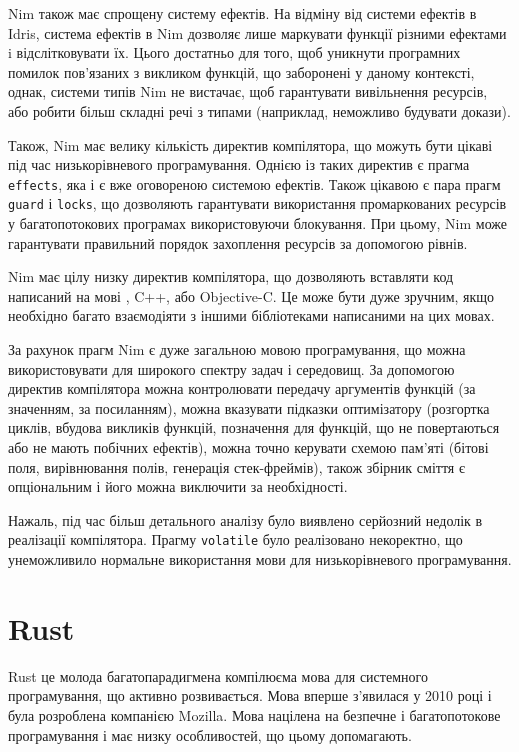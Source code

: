 \documentclass[oneside,14pt,a4paper,final]{myextreport}
\newcommand\code[1]{{\tt #1}}
\begin{document}
Nim також має спрощену систему ефектів. На відміну від системи ефектів в Idris, система ефектів в Nim дозволяє лише маркувати функції різними ефектами i відслітковувати їх. Цього достатньо для того, щоб уникнути програмних помилок пов'язаних з викликом функцій, що заборонені у даному контексті, однак, системи типів Nim не вистачає, щоб гарантувати вивільнення ресурсів, або робити більш складні речі з типами (наприклад, неможливо будувати докази).

Також, Nim має велику кількість директив компілятора\cite{nim:directives}, що можуть бути цікаві під час низькорівневого програмування. Однією із таких директив є прагма \code{effects}, яка і є вже оговореною системою ефектів. Також цікавою є пара прагм \code{guard} і \code{locks}, що дозволяють гарантувати використання промаркованих ресурсів у багатопотокових програмах використовуючи блокування. При цьому, Nim може гарантувати правильний порядок захоплення ресурсів за допомогою рівнів.

Nim має цілу низку директив компілятора, що дозволяють вставляти код написаний на мові \LangC{}, C++, або Objective-C. Це може бути дуже зручним, якщо необхідно багато взаємодіяти з іншими бібліотеками написаними на цих мовах.

За рахунок прагм Nim є дуже загальною мовою програмування, що можна використовувати для широкого спектру задач і середовищ. За допомогою директив компілятора можна контролювати передачу аргументів функцій (за значенням, за посиланням), можна вказувати підказки оптимізатору (розгортка циклів, вбудова викликів функцій, позначення для функцій, що не повертаються або не мають побічних ефектів), можна точно керувати схемою пам'яті (бітові поля, вирівнювання полів, генерація стек-фреймів), також збірник сміття є опціональним і його можна виключити за необхідності.

Нажаль, під час більш детального аналізу було виявлено серйозний недолік в реалізації компілятора. Прагму \code{volatile} було реалізовано некоректно\cite{nim:volatile}, що унеможливило нормальне використання мови для низькорівневого програмування.

\section{Rust}

Rust\cite{rust} це молода багатопарадигмена компілюєма мова для системного програмування, що активно розвивається. Мова вперше з'явилася у 2010 році і була розроблена компанією Mozilla\cite{rust:mozilla}. Мова націлена на безпечне і багатопотокове програмування і має низку особливостей, що цьому допомагають.
\end{document}
